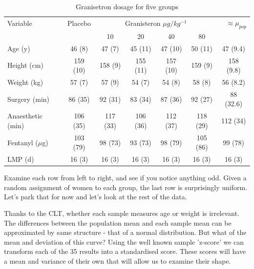 \documentclass[a4paper,twosided,notoc]{tufte-book}
\begin{document}
\begin{table}[h]
	\begin{center}
		\footnotesize
		\begin{tabular}{lcccccc}
			\toprule
			\multicolumn{1}{l}{Variable} & \multicolumn{1}{c}{Placebo} & \multicolumn{4}{|c|}{Granisteron $\mu g/kg^{-1}$} & \multicolumn{1}{r}{$\approx\mu_{pop}$} \\
			 &  & 10 & 20 & 40 & 80 & \\
			\midrule
			Age (y)                         & 46 (8)   & 47 (7)   & 45 (11)  & 47 (10)  & 50 (11)  & 47 (9.4)   \\
			Height (cm)                     & 159 (10) & 158 (9)  & 155 (11) & 157 (10) & 159 (9)  & 158 (9.8) \\
			Weight (kg)                     & 57 (7)   & 57 (9)   & 54 (7)   & 54 (8)   & 58 (8)   & 56 (8.2)   \\
			Surgery (min)                   & 86 (35)  & 92 (31)  & 83 (34)  & 87 (36)  & 92 (27)  & 88 (32.6)  \\
			Anaesthetic (min)               & 106 (35) & 117 (33) & 106 (36) & 112 (37) & 118 (29) & 112 (34) \\
			Fentanyl\footnotemark{} ($\mu$g) 				& 103 (79) & 98 (73)  & 93 (73)  & 98 (79)  & 105 (86) & 99 (78)  \\
			LMP\footnotemark{} (d)       & 16 (3)   & 16 (3)   & 16 (3)   & 16 (3)   & 16 (3)   & 16 (3) \\
			\bottomrule
		\end{tabular}
	\end{center}
	\caption{Granisetron dosage for five groups}
	\label{tab:heading-styles}
\end{table}

Examine each row from left to right, and see if you notice anything odd. Given a random assignment of women to each group, the last row is surprisingly uniform. Let's park that for now and let's look at the rest of the data.

Thanks to the CLT, whether each sample measures age or weight is irrelevant. The differences between the population mean and each sample mean can be approximated by same structure - that of a normal distribution. But what of the mean and deviation of this curve? Using the well known sample 'z-score' we can transform each of the 35 results into a standardised score. These scores will have a mean and variance of their own that will allow us to examine their shape.
\end{document}
